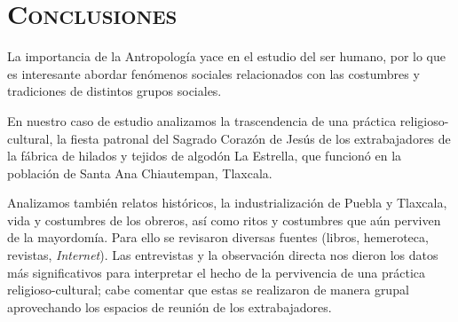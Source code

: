 \documentclass[14pt,letterpaper,twoside]{extbook} %
\begin{document}
%

\chapter*{\centering\mdseries\Large\textsc{Conclusiones}}
\pagestyle{fancy}
\fancyhf{}
\fancyfoot[RO,LE]{\hfill \thepage \hfill}

\noindent La importancia de la Antropología yace en el estudio del ser humano, por lo que es interesante abordar fenómenos sociales relacionados con las costumbres y tradiciones de distintos grupos sociales.

En nuestro caso de estudio analizamos la trascendencia de una práctica religioso-cultural, la fiesta patronal del Sagrado Corazón de Jesús de los extrabajadores de la fábrica de hilados y tejidos de algodón La Estrella, que funcionó en la población de Santa Ana Chiautempan, Tlaxcala.

Analizamos también relatos históricos, la industrialización de Puebla y Tlaxcala, vida y costumbres de los obreros, así como ritos y costumbres que aún perviven de la mayordomía. Para ello se revisaron diversas fuentes (libros, hemeroteca, revistas, \textit{Internet}). Las entrevistas y la observación directa nos dieron los datos más significativos para interpretar el hecho de la pervivencia de una práctica religioso-cultural; cabe comentar que estas se realizaron de manera grupal aprovechando los espacios de reunión de los extrabajadores.
\end{document}
